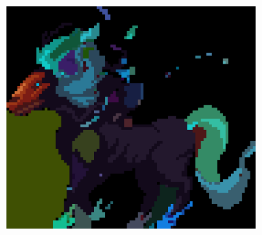\begin{figure}[h!]
\begin{minipage}[b]{0.25\textwidth}
    \end{minipage}
    \hfill 
    \begin{minipage}[b]{0.25\textwidth}
        \includegraphics[width=\textwidth]{imagens/Result3.png}
    \end{minipage}
\end{figure}

